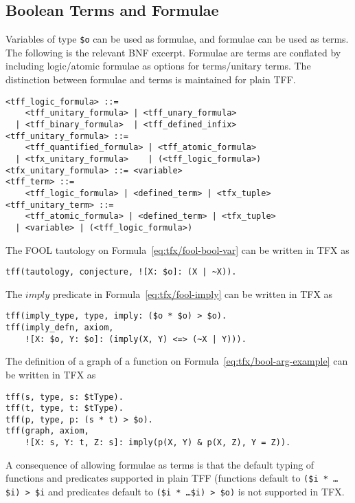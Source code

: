 \subsection{Boolean Terms and Formulae}

Variables of type \lstinline'$o' can be used as formulae, and formulae can be 
used as terms. 
The following is the relevant BNF excerpt.
Formulae are terms are conflated by including logic/atomic formulae as
options for terms/unitary terms.
The distinction between formulae and terms is maintained for plain TFF.
\begin{lstlisting}[language=bnf]
<tff_logic_formula> ::=
    <tff_unitary_formula> | <tff_unary_formula>
  | <tff_binary_formula>  | <tff_defined_infix>
<tff_unitary_formula> ::=
    <tff_quantified_formula> | <tff_atomic_formula>
  | <tfx_unitary_formula>    | (<tff_logic_formula>)
<tfx_unitary_formula> ::= <variable>
<tff_term> ::=
    <tff_logic_formula> | <defined_term> | <tfx_tuple>
<tff_unitary_term> ::=
    <tff_atomic_formula> | <defined_term> | <tfx_tuple>
  | <variable> | (<tff_logic_formula>)
\end{lstlisting}

The FOOL tautology on Formula~\ref{eq:tfx/fool-bool-var} can be written in TFX as
\begin{lstlisting}[language=tptp]
tff(tautology, conjecture, ![X: $o]: (X | ~X)).
\end{lstlisting}

The $\mathit{imply}$ predicate in Formula~\ref{eq:tfx/fool-imply} can 
be written in TFX as
\begin{lstlisting}[language=tptp]
tff(imply_type, type, imply: ($o * $o) > $o).
tff(imply_defn, axiom,
    ![X: $o, Y: $o]: (imply(X, Y) <=> (~X | Y))).
\end{lstlisting}


The definition of a graph of a function on Formula~\ref{eq:tfx/bool-arg-example} can be written in TFX as
\begin{lstlisting}[language=tptp]
tff(s, type, s: $tType).
tff(t, type, t: $tType).
tff(p, type, p: (s * t) > $o).
tff(graph, axiom,
    ![X: s, Y: t, Z: s]: imply(p(X, Y) & p(X, Z), Y = Z)).
\end{lstlisting}

A consequence of allowing formulae as terms is that the default typing of 
functions and predicates supported in plain TFF (functions default to 
{\tt (\$i * \ldots * \$i) > \$i} and predicates default to 
{\tt (\$i * \ldots * \$i) > \$o)} is not supported in TFX.

